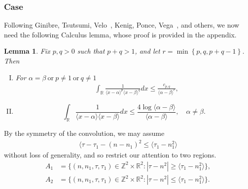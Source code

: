 \documentclass[12pt,reqno]{amsart}
\numberwithin{equation}{section}  %
\newcommand{\rr}{\mathbb{R}}
\newcommand{\zz}{\mathbb{Z}}
\newtheorem{lemma}[theorem]{Lemma}
\begin{document}
 \subsubsection{Case } 
\label{ssec:case-it-6}
Following Ginibre, Tsutsumi, Velo~\cite{Ginibre:1997jp}, Kenig, Ponce, Vega~\cite{Kenig:1996yn}, and others,
we now need the following Calculus lemma, whose proof is provided in the
appendix.
%
%
%
%
%
%
%
\begin{lemma}
	\label{lem:calc}
 Fix $p, q > 0$ such that $p +q >1$, and let $r =\min\left\{p, q, p+q-1
 \right\}$. Then 
 \begin{enumerate}[(I)]
   \item
For $\alpha=\beta \ \text{or} \ p \neq 1 \ \text{or} \ q \neq 1$
 \begin{equation*}
\begin{split}
  & \int_{\rr} \frac{1}{\langle x - \alpha \rangle ^{p} \langle x -
  \beta \rangle
  ^{q}} d x
  \le \frac{c_{p,q}}{\langle \alpha - \beta \rangle ^{r}}, 
  \end{split}
\end{equation*}
  \item
    \begin{equation*}
  \int_{\rr} \frac{1}{\langle x - \alpha \rangle  \langle x - \beta
  \rangle} d x
  \le  \frac{4 \log \langle \alpha - \beta \rangle}{\langle \alpha - \beta
  \rangle}, \quad \alpha \neq \beta.
\end{equation*}
\end{enumerate}
\end{lemma}
%
%
%
%
%
%
%
%
By the symmetry of the convolution, we may assume
%
%
\begin{equation*}
\begin{split}
\langle \tau - \tau_{1} - (n - n_{1})^{2} \le
\langle \tau_{1} - n_{1}^{2} \rangle 
\end{split}
\end{equation*}
%
without loss of generality, and so restrict our attention to two regions.
%
\begin{align*}
  A_{1}&=\{(n, n_1, \tau, \tau_1)\in \zz^{2} \times \rr^{2}: |\tau-n^{2}|\ge \langle \tau_{1} - n_{1}^{2} \rangle  \},\\
  A_{2}&=\{(n, n_1, \tau, \tau_1)\in \zz^{2} \times \rr^{2}: |\tau-n^2| \le \langle \tau_{1} - n_{1}^{2} \rangle\}.
\end{align*} 
\end{document}
